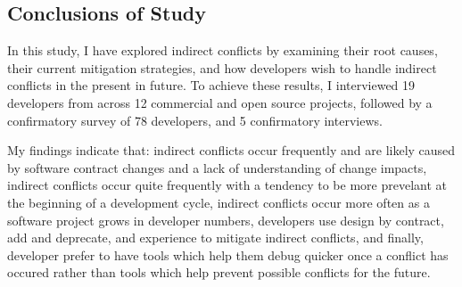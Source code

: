 \subsection{Conclusions of Study}

In this study, I have explored indirect conflicts by examining their root causes, their current mitigation strategies, and how developers
wish to handle indirect conflicts in the present in future. To achieve these results, I interviewed 19 developers from across 12 commercial 
and open source projects, followed by a confirmatory survey of 78 developers, and 5 confirmatory interviews.

My findings indicate that: 
indirect conflicts occur frequently and are likely caused by software contract changes and a lack of understanding of change impacts,
indirect conflicts occur quite frequently with a tendency to be more prevelant at the beginning of a development cycle, indirect conflicts
occur more often as a software project grows in developer numbers, developers use design by contract, add and deprecate, and experience
to mitigate indirect conflicts, and finally, developer prefer to have tools which help them debug quicker once a conflict has occured rather
than tools which help prevent possible conflicts for the future.
